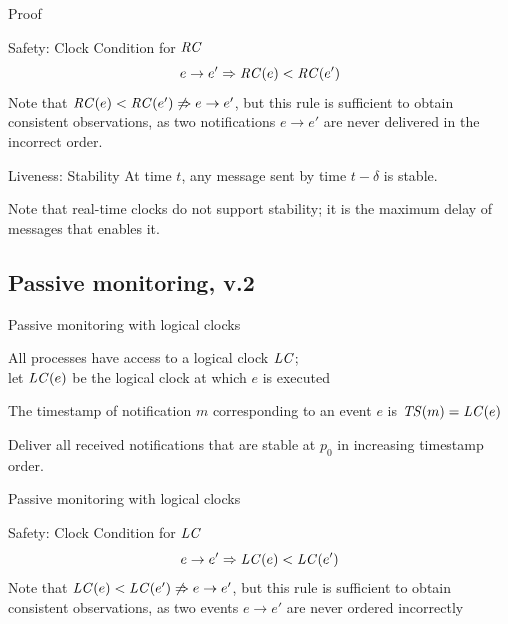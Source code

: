 \begin{frame}{Proof}

\begin{block}{Safety: Clock Condition for $\mathit{RC}$} 
\[
  e \rightarrow e' \Rightarrow \mathit{RC}(e) < \mathit{RC}(e') 
\]
Note that $\mathit{RC}(e) < \mathit{RC}(e') \not\Rightarrow e \rightarrow e'$, but 
this rule is sufficient to obtain consistent observations, as
two notifications $e \rightarrow e'$ are never delivered in the incorrect
order.
\end{block}

\medskip
\begin{block}{Liveness: Stability}
At time $t$, any message sent by time $t-\delta$ is stable.
\end{block}

\medskip
Note that real-time clocks do not support stability; it is the
maximum delay of messages that enables it.
\end{frame}

\subsection{Passive monitoring, v.2}


\begin{frame}{Passive monitoring with logical clocks}

\BI
\item All processes have access to a logical clock $\mathit{LC}$; \\
  let $\mathit{LC}(e)$ be the logical clock at which $e$ is executed
\item The timestamp of notification $m$ corresponding to an event $e$
  is $\mathit{TS}(m) = \mathit{LC}(e)$
\EI

\begin{definition}
Deliver all received notifications that are stable at $p_0$ in increasing timestamp order.
\end{definition}

\end{frame}


\begin{frame}{Passive monitoring with logical clocks}

\begin{block}{Safety: Clock Condition for $\mathit{LC}$} 
\[
e \rightarrow e' \Rightarrow \mathit{LC}(e) < \mathit{LC}(e')
\] 
Note that $\mathit{LC}(e) < \mathit{LC}(e') \not\Rightarrow e \rightarrow e'$, but 
this rule is sufficient to obtain consistent observations, as
two events $e \rightarrow e'$ are never ordered incorrectly
\end{block}

\end{frame}

